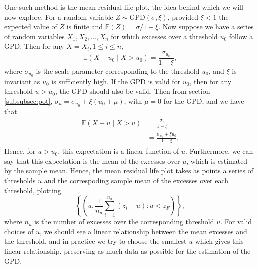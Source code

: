 \documentclass{article}
\numberwithin{equation}{section}
\begin{document}
One such method is the mean residual life plot, the idea behind which we will now explore. 
For a random variable $Z \sim \text{GPD}(\sigma, \xi)$, provided $\xi < 1$ the expected value of $Z$ is finite and $\mathbb{E}(Z) = \sigma/1 - \xi$.
Now suppose we have a series of random variables $X_1, X_2, \ldots, X_n$ for which excesses over a threshold $u_0$ follow a GPD. 
Then for any $X = X_i, 1 \le i \le n$, 
\[
  \mathbb{E}(X - u_0 \mid X > u_0) = \frac{\sigma_{u_0}}{1 - \xi},
\]
where $\sigma_{u_0}$ is the scale parameter corresponding to the threshold $u_0$, and $\xi$ is invariant as $u_0$ is sufficiently high.
If the GPD is valid for $u_0$, then for any threshold $u > u_0$, the GPD should also be valid.
Then from section \ref{subsubsec:pot}, $\sigma_u = \sigma_{u_0} + \xi(u_0 + \mu)$, with $\mu = 0$ for the GPD, and we have that 
\begin{align} \label{eq:lin_u}
  \begin{split}
  \mathbb{E}(X - u \mid X > u) &= \frac{\sigma_u}{1 - \xi} \\
                                   &= \frac{\sigma_{u_0} + \xi u_0}{1-\xi}.
  \end{split}
\end{align}
Hence, for $u > u_0$, this expectation is a linear function of $u$. 
Furthermore, we can say that this expectation is the mean of the excesses over $u$, which is estimated by the sample mean. 
Hence, the mean residual life plot takes as points a series of thresholds $u$ and the correspoding sample mean of the excesses over each threshold, plotting
\[
  \left\{\left( u, \frac{1}{n_u} \sum_{i=1}^{n_u}{\left(z_i - u\right)}: u < z_{F} \right) \right\},
\]
where $n_u$ is the number of excesses over the corresponding threshold $u$.
For valid choices of $u$, we should see a linear relationship between the mean excesses and the threshold, and in practice we try to choose the smallest $u$ which gives this linear relationship, preserving as much data as possible for the estimation of the GPD.
\end{document}
